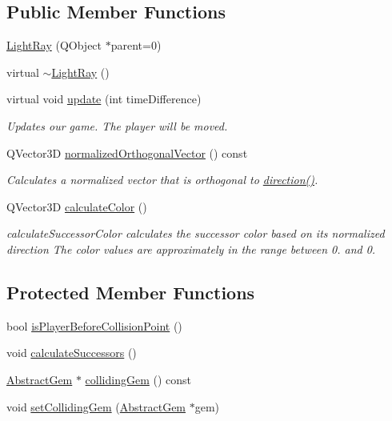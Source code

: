 \subsection*{Public Member Functions}
\begin{DoxyCompactItemize}
\item 
\hyperlink{class_light_ray_a311f25dc81f2acfe6bc9f7379f76e6fe}{Light\+Ray} (Q\+Object $\ast$parent=0)
\item 
virtual \hyperlink{class_light_ray_a1ec27c859b1851ef680f803ae0555f17}{$\sim$\+Light\+Ray} ()
\item 
virtual void \hyperlink{class_light_ray_acf06a71a307433fa5b220baccf809e64}{update} (int time\+Difference)
\begin{DoxyCompactList}\small\item\em Updates our game. The player will be moved. \end{DoxyCompactList}\item 
Q\+Vector3\+D \hyperlink{class_light_ray_ab8723690d8af8cb9b4ba339eff784135}{normalized\+Orthogonal\+Vector} () const 
\begin{DoxyCompactList}\small\item\em Calculates a normalized vector that is orthogonal to \hyperlink{class_light_ray_a001a750a7d287ce54dd1772aa18be6c7}{direction()}. \end{DoxyCompactList}\item 
Q\+Vector3\+D \hyperlink{class_light_ray_afe5d6813717569166a2c2ca29b2bc923}{calculate\+Color} ()
\begin{DoxyCompactList}\small\item\em calculate\+Successor\+Color calculates the successor color based on its normalized direction The color values are approximately in the range between 0. and 0. \end{DoxyCompactList}\end{DoxyCompactItemize}
\subsection*{Protected Member Functions}
\begin{DoxyCompactItemize}
\item 
bool \hyperlink{class_light_ray_ad2f26e29e0781597f7bf106396ba2fb7}{is\+Player\+Before\+Collision\+Point} ()
\item 
void \hyperlink{class_light_ray_a1711b1964da22ce4083740adc2233780}{calculate\+Successors} ()
\item 
\hyperlink{class_abstract_gem}{Abstract\+Gem} $\ast$ \hyperlink{class_light_ray_a9db8f3d965dec84c167b6634bee842f4}{colliding\+Gem} () const 
\item 
void \hyperlink{class_light_ray_a87c45492f6508b5c1adf8300babf8eeb}{set\+Colliding\+Gem} (\hyperlink{class_abstract_gem}{Abstract\+Gem} $\ast$gem)
\end{DoxyCompactItemize}
